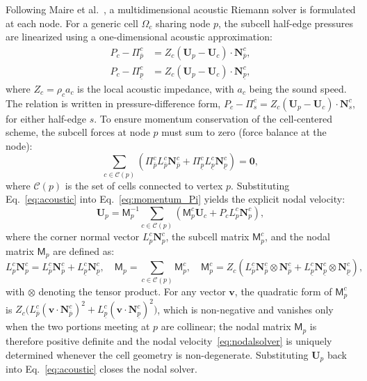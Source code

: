 \documentclass[a4paper]{cas-sc}
\begin{document}
Following Maire et al.~\cite{maire2007SIAM}, a multidimensional acoustic Riemann solver is formulated at each node. For a generic cell $\Omega_c$ sharing node $p$, the subcell half-edge pressures are linearized using a one-dimensional acoustic approximation:
\begin{equation}
	\begin{aligned}
		P_c-\Pi_{\overline{p}}^c &= Z_c (\boldsymbol{U}_p - \boldsymbol{U}_c) \cdot \boldsymbol{N}_{\overline{p}}^c,\\
		P_c-\Pi_{\underline{p}}^c &= Z_c (\boldsymbol{U}_p - \boldsymbol{U}_c) \cdot \boldsymbol{N}_{\underline{p}}^c,
	\end{aligned}
	\label{eq:acoustic}
\end{equation}
where $Z_c = \rho_c a_c$ is the local acoustic impedance, with $a_c$ being the sound speed. The relation is written in pressure-difference form, $P_c-\Pi_s^c=Z_c(\boldsymbol{U}_p-\boldsymbol{U}_c)\cdot\boldsymbol{N}_s^c$, for either half-edge $s$. To ensure momentum conservation of the cell-centered scheme, the subcell forces at node $p$ must sum to zero (force balance at the node):
\begin{equation}
	\sum_{c \in \mathcal{C}(p)} \left( \Pi_{\overline{p}}^c L_{\overline{p}}^c \boldsymbol{N}_{\overline{p}}^c + \Pi_{\underline{p}}^c L_{\underline{p}}^c \boldsymbol{N}_{\underline{p}}^c \right) = \boldsymbol{0},
	\label{eq:momentum_Pi}
\end{equation}
where $\mathcal{C}(p)$ is the set of cells connected to vertex $p$. Substituting Eq.~\eqref{eq:acoustic} into Eq.~\eqref{eq:momentum_Pi} yields the explicit nodal velocity:
\begin{equation}
\boldsymbol{U}_p = \mathsf{M}_p^{-1} \sum_{c \in \mathcal{C}(p)} \left( \mathsf{M}_p^c \boldsymbol{U}_c + P_c L_{p}^c \boldsymbol{N}_{p}^c \right),
	\label{eq:nodalsolver}
\end{equation}
where the corner normal vector $L_p^c \boldsymbol{N}_p^c$, the subcell matrix $\mathsf{M}_p^c$, and the nodal matrix $\mathsf{M}_p$ are defined as:
\begin{equation}
	L_{p}^c \boldsymbol{N}_{p}^c = L_{\overline{p}}^c \boldsymbol{N}_{\overline{p}}^c + L_{\underline{p}}^c \boldsymbol{N}_{\underline{p}}^c,\quad
	\mathsf{M}_p = \sum_{c \in \mathcal{C}(p)} \mathsf{M}_p^c,\quad
	\mathsf{M}_p^c = Z_c \left( L_{\overline{p}}^c \boldsymbol{N}_{\overline{p}}^c \otimes \boldsymbol{N}_{\overline{p}}^c + L_{\underline{p}}^c \boldsymbol{N}_{\underline{p}}^c \otimes \boldsymbol{N}_{\underline{p}}^c \right),
	\label{eq:matrixP}
\end{equation}
with $\otimes$ denoting the tensor product. For any vector $\boldsymbol v$, the quadratic form of $\mathsf M_p^c$ is $Z_c\bigl(L_{\overline p}^c(\boldsymbol v\cdot\boldsymbol N_{\overline p}^c)^2+L_{\underline p}^c(\boldsymbol v\cdot\boldsymbol N_{\underline p}^c)^2\bigr)$, which is non-negative and vanishes only when the two portions meeting at $p$ are collinear; the nodal matrix $\mathsf M_p$ is therefore positive definite and the nodal velocity~\eqref{eq:nodalsolver} is uniquely determined whenever the cell geometry is non-degenerate. Substituting $\boldsymbol{U}_p$ back into Eq.~\eqref{eq:acoustic} closes the nodal solver.
\end{document}
